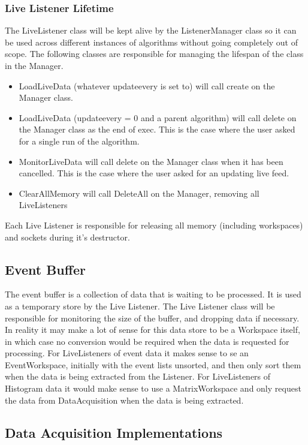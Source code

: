 \subsubsection{Live Listener Lifetime}
The LiveListener class will be kept alive by the ListenerManager class so it can be used across different instances of algorithms without going completely out of scope.  The following classes are responsible for managing the lifespan of the class in the Manager.
\begin{itemize}
\item LoadLiveData (whatever updateevery is set to) will call create on the Manager class.
\item LoadLiveData (updateevery = 0 and a parent algorithm) will call delete on the Manager class as the end of exec. This is the case where the user asked for a single run of the algorithm.
\item MonitorLiveData will call delete on the Manager class when it has been cancelled. This is the case where the user asked for an updating live feed.
\item ClearAllMemory will call DeleteAll on the Manager, removing all LiveListeners
\end{itemize}

Each Live Listener is responsible for releasing all memory (including workspaces) and sockets during it's destructor.



\subsection{Event Buffer}
The event buffer is a collection of data that is waiting to be processed. It is used as a temporary store by the Live Listener.  The Live Listener class will be responsible for monitoring the size of the buffer, and dropping data if necessary.  In reality it may make a lot of sense for this data store to be a Workspace itself, in which case no conversion would be required when the data is requested for processing.  For LiveListeners of event data it makes sense to se an EventWorkspace, initially with the event lists unsorted, and then only sort them when the data is being extracted from the Listener.  For LiveListeners of Histogram data it would make sense to use a MatrixWorkspace and only request the data from DataAcquisition when the data is being extracted.

\subsection{Data Acquisition Implementations}

